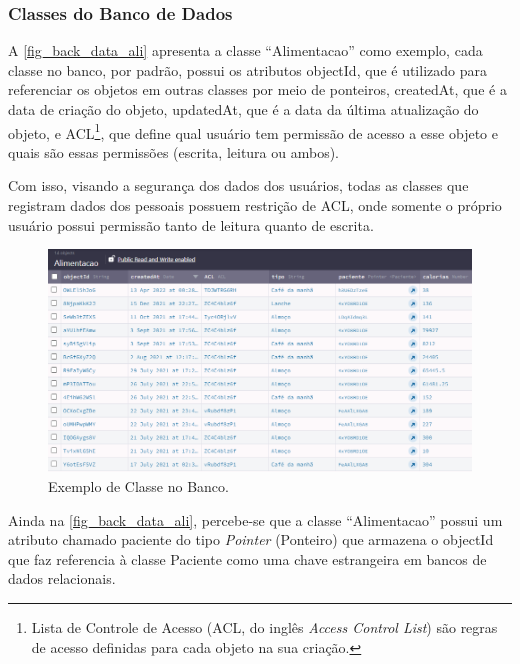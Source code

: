 \subsubsection{Classes do Banco de Dados}

A \autoref{fig_back_data_ali} apresenta a classe ``Alimentacao'' como exemplo, cada classe no banco, por padrão,
possui os atributos objectId, que é utilizado para referenciar os objetos em outras classes por
meio de ponteiros, createdAt, que é a data de criação do objeto, updatedAt, que é a data da última atualização
do objeto, e ACL\footnote{Lista de Controle de Acesso (ACL, do inglês \emph{\textit{Access Control List}})
    são regras de acesso definidas para cada objeto na sua criação.}, que define qual usuário tem permissão de acesso a
esse objeto e quais são essas permissões (escrita, leitura ou ambos).

Com isso, visando a segurança dos dados dos usuários, todas as classes que registram dados dos pessoais
possuem restrição de ACL, onde somente o próprio usuário possui permissão tanto de leitura quanto de escrita.

\begin{figure}[htb]
    \caption{\label{fig_back_data_ali}Exemplo de Classe no Banco.}
    \begin{center}
        \includegraphics[scale=0.63]{Imagens/desenvolvimento/back4app_database_alimentacao.png}
    \end{center}
\end{figure}

Ainda na \autoref{fig_back_data_ali}, percebe-se que a classe ``Alimentacao'' possui um atributo chamado paciente do tipo
\emph{Pointer} (Ponteiro) que armazena o objectId que faz referencia à classe Paciente como uma chave estrangeira em
bancos de dados relacionais.

